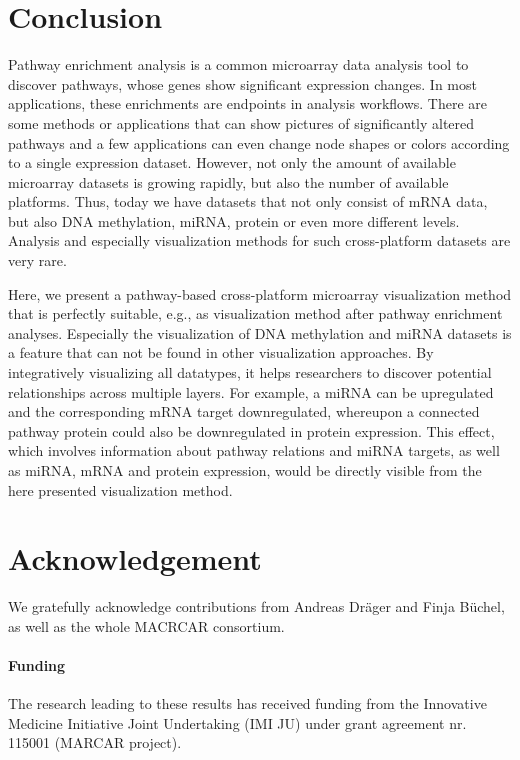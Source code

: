 \documentclass{bioinfo}
\begin{document}
\section{Conclusion}

Pathway enrichment analysis is a common microarray data analysis tool to discover pathways, whose
genes show significant expression changes. In most applications, these enrichments are endpoints in
analysis workflows. There are some methods or applications that can show pictures of significantly
altered pathways and a few applications can even change node shapes or colors according to a single
expression dataset. However, not only the amount of available microarray datasets is growing
rapidly, but also the number of available platforms. Thus, today we have datasets that not only
consist of mRNA data, but also DNA methylation, miRNA, protein or even more different
levels. Analysis and especially visualization methods for such cross-platform datasets are very
rare.

Here, we present a pathway-based cross-platform microarray visualization method that is perfectly
suitable, e.g., as visualization method after pathway enrichment analyses. Especially the
visualization of DNA methylation and miRNA datasets is a feature that can not be found in other
visualization approaches. By integratively visualizing all datatypes, it helps researchers to
discover potential relationships across multiple layers. For example, a miRNA can be upregulated and
the corresponding mRNA target downregulated, whereupon a connected pathway protein could also be
downregulated in protein expression. This effect, which involves information about pathway relations
and miRNA targets, as well as miRNA, mRNA and protein expression, would be directly visible from the
here presented visualization method.


\section*{Acknowledgement}
We gratefully acknowledge contributions from Andreas Dr\"ager and Finja B\"uchel, as well as the
whole MACRCAR consortium.

\paragraph{Funding\textcolon}
The research leading to these results has received funding from the Innovative Medicine Initiative
Joint Undertaking (IMI JU) under grant agreement nr. 115001 (MARCAR project).


%
%
%
%
%


\end{document}
